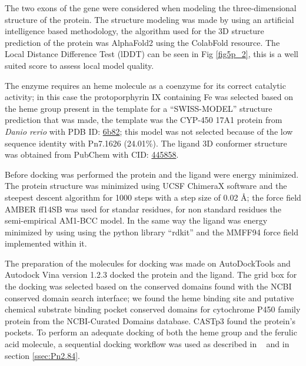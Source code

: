 \documentclass[12pt]{article}
\newcommand{\textcite}[1]{\citeauthor{#1}~\citeyear{#1}}
\begin{document}
	The two exons of the gene were considered when modeling the three-dimensional structure of the protein. The structure modeling was made by using an artificial intelligence based methodology, the algorithm used for the 3D structure prediction of the protein was AlphaFold2 using the ColabFold resource. \cite{alphafold,colabfold} The Local Distance Difference Test (lDDT) can be seen in Fig \ref{fig5p_2}, this is a well suited score to assess local model quality. \cite{lddt}
	
	The enzyme requires an heme molecule as a coenzyme for its correct catalytic activity; in this case the protoporphyrin IX containing Fe was selected based on the heme group present in the template for a ``SWISS-MODEL'' structure prediction that was made, the template was the CYP-450 17A1 protein from \textit{Danio rerio} with PDB ID: \href{https://www.rcsb.org/structure/6b82}{6b82}; this model was not selected because of the low sequence identity with Pn7.1626 (24.01\%). The ligand 3D conformer structure was obtained from PubChem with CID: \href{https://pubchem.ncbi.nlm.nih.gov/compound/445858}{445858}.
	
	Before docking was performed the protein and the ligand were energy minimized. The protein structure was minimized using UCSF ChimeraX software \cite{chimera,chimera_2} and the steepest descent algorithm for 1000 steps with a step size of 0.02 \r{A}; the force field AMBER ff14SB was used for standar residues, for non standard residues the semi-empirical AM1-BCC model. \cite{am1_bcc,am1_bcc_2,am1_bcc_3} In the same way the ligand was energy minimized by using using the python library ``rdkit'' and the MMFF94 force field implemented within it. \cite{rdkit,rdkit_mmff}
	
	The preparation of the molecules for docking was made on AutoDockTools and Autodock Vina version 1.2.3 docked the protein and the ligand. \cite{adt,vina,vina_2} The grid box for the docking was selected based on the conserved domains found with the NCBI conserved domain search interface; we found the heme binding site and putative chemical substrate binding pocket conserved domains for cytochrome P450 family protein from the NCBI-Curated Domains database. \cite{cdd,cdd_2}  CASTp3 found the protein's pockets. \cite{castp} To perform an adequate docking of both the heme group and the ferulic acid molecule, a sequential docking workflow was used as described in \textcite{sequential} and in section \ref{ssec:Pn2.84}.
	
\end{document}
